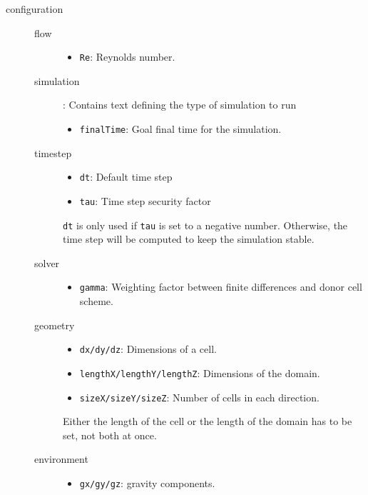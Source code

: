 \documentclass[pdftex,A4]{article}
\begin{document}
\begin{description}
\item [configuration]\hfill

    \begin{description}
    \item [flow] \hfill
        \begin{itemize}
            \item {\tt Re}: Reynolds number.
        \end{itemize}
    \item [simulation]: Contains text defining the type of simulation to run \hfill
        \begin{itemize}
            \item {\tt finalTime}: Goal final time for the simulation.
        \end{itemize}
    \item [timestep] \hfill
        \begin{itemize}
            \item {\tt dt}: Default time step
            \item {\tt tau}: Time step security factor
        \end{itemize}
        {\tt dt} is only used if {\tt tau} is set to a negative number. Otherwise, the time step will be computed to keep the simulation stable.
    \item [solver] \hfill
        \begin{itemize}
            \item {\tt gamma}: Weighting factor between finite differences and donor cell scheme.
        \end{itemize}
    \item [geometry] \hfill
        \begin{itemize}
            \item {\tt dx/dy/dz}: Dimensions of a cell.
            \item {\tt lengthX/lengthY/lengthZ}: Dimensions of the domain.
            \item {\tt sizeX/sizeY/sizeZ}: Number of cells in each direction.
        \end{itemize}
        Either the length of the cell or the length of the domain has to be set, not both at once.

    \item [environment] \hfill
        \begin{itemize}
            \item {\tt gx/gy/gz}: gravity components.
        \end{itemize}


\end{description}
\end{description}
\end{document}
